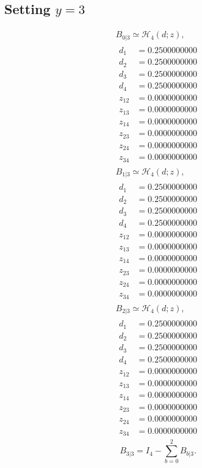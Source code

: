 \documentclass[11pt]{article}
\begin{document}
\subsection*{Setting $y=3$}
\[
\begin{gathered}
B_{0|3}\simeq\mathcal H_4(d;z),\\[3pt]
\begin{aligned}
d_1&=0.2500000000 \\
d_2&=0.2500000000 \\
d_3&=0.2500000000 \\
d_4&=0.2500000000 \\
z_{12}&=0.0000000000 \\
z_{13}&=0.0000000000 \\
z_{14}&=0.0000000000 \\
z_{23}&=0.0000000000 \\
z_{24}&=0.0000000000 \\
z_{34}&=0.0000000000
\end{aligned}
\end{gathered}
\]
\[
\begin{gathered}
B_{1|3}\simeq\mathcal H_4(d;z),\\[3pt]
\begin{aligned}
d_1&=0.2500000000 \\
d_2&=0.2500000000 \\
d_3&=0.2500000000 \\
d_4&=0.2500000000 \\
z_{12}&=0.0000000000 \\
z_{13}&=0.0000000000 \\
z_{14}&=0.0000000000 \\
z_{23}&=0.0000000000 \\
z_{24}&=0.0000000000 \\
z_{34}&=0.0000000000
\end{aligned}
\end{gathered}
\]
\[
\begin{gathered}
B_{2|3}\simeq\mathcal H_4(d;z),\\[3pt]
\begin{aligned}
d_1&=0.2500000000 \\
d_2&=0.2500000000 \\
d_3&=0.2500000000 \\
d_4&=0.2500000000 \\
z_{12}&=0.0000000000 \\
z_{13}&=0.0000000000 \\
z_{14}&=0.0000000000 \\
z_{23}&=0.0000000000 \\
z_{24}&=0.0000000000 \\
z_{34}&=0.0000000000
\end{aligned}
\end{gathered}
\]
\[
B_{3|3}=I_4-\sum_{b=0}^2B_{b|3}.
\]
\end{document}
